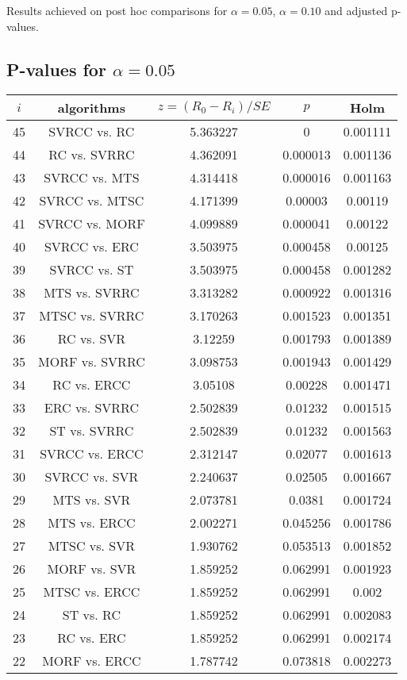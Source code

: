\documentclass[a4paper,10pt]{article}
\begin{document}
\begin{landscape}
Results achieved on post hoc comparisons for $\alpha = 0.05$, $\alpha = 0.10$ and adjusted p-values.

\subsection{P-values for $\alpha=0.05$}

\begin{table}[!htp]
\centering\scriptsize
\begin{tabular}{ccccc}
$i$&algorithms&$z=(R_0 - R_i)/SE$&$p$&Holm\\
\hline45&SVRCC vs. RC&5.363227&0&0.001111\\
44&RC vs. SVRRC&4.362091&0.000013&0.001136\\
43&SVRCC vs. MTS&4.314418&0.000016&0.001163\\
42&SVRCC vs. MTSC&4.171399&0.00003&0.00119\\
41&SVRCC vs. MORF&4.099889&0.000041&0.00122\\
40&SVRCC vs. ERC&3.503975&0.000458&0.00125\\
39&SVRCC vs. ST&3.503975&0.000458&0.001282\\
38&MTS vs. SVRRC&3.313282&0.000922&0.001316\\
37&MTSC vs. SVRRC&3.170263&0.001523&0.001351\\
36&RC vs. SVR&3.12259&0.001793&0.001389\\
35&MORF vs. SVRRC&3.098753&0.001943&0.001429\\
34&RC vs. ERCC&3.05108&0.00228&0.001471\\
33&ERC vs. SVRRC&2.502839&0.01232&0.001515\\
32&ST vs. SVRRC&2.502839&0.01232&0.001563\\
31&SVRCC vs. ERCC&2.312147&0.02077&0.001613\\
30&SVRCC vs. SVR&2.240637&0.02505&0.001667\\
29&MTS vs. SVR&2.073781&0.0381&0.001724\\
28&MTS vs. ERCC&2.002271&0.045256&0.001786\\
27&MTSC vs. SVR&1.930762&0.053513&0.001852\\
26&MORF vs. SVR&1.859252&0.062991&0.001923\\
25&MTSC vs. ERCC&1.859252&0.062991&0.002\\
24&ST vs. RC&1.859252&0.062991&0.002083\\
23&RC vs. ERC&1.859252&0.062991&0.002174\\
22&MORF vs. ERCC&1.787742&0.073818&0.002273\\

\end{tabular}
\end{table}
\end{landscape}
\end{document}
